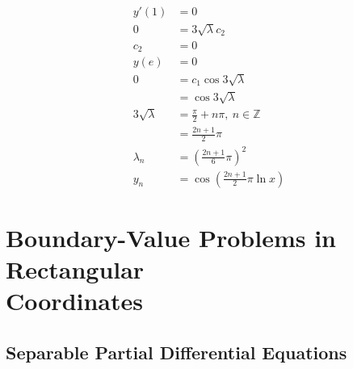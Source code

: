 \documentclass{article}
\begin{document}
\begin{align*}
  y'(1)                                                   & = 0                                                                                                  \\
  0                                                       & = 3 \sqrt{\lambda} c_2                                                                               \\
  c_2                                                     & = 0                                                                                                  \\
  y(e)                                                    & = 0                                                                                                  \\
  0                                                       & = c_1 \cos 3 \sqrt{\lambda}                                                                          \\
                                                          & = \cos 3 \sqrt{\lambda}                                                                              \\
  3 \sqrt{\lambda}                                        & = \frac{\pi}{2} + n \pi,\ n \in \mathbb{Z}                                                           \\
                                                          & = \frac{2 n + 1}{2} \pi                                                                              \\
  \lambda_n                                               & = \left( \frac{2 n + 1}{6} \pi \right)^2                                                             \\
  y_n                                                     & = \cos \left( \frac{2 n + 1}{2} \pi \ln x \right)
\end{align*}

\section{Boundary-Value Problems in Rectangular\\Coordinates}

\subsection{Separable Partial Differential Equations}

\subsubsection{}
\end{document}
